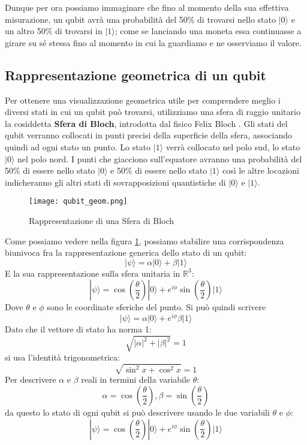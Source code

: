 Dunque per ora possiamo immaginare che fino al momento della sua effettiva misurazione, un qubit avrà una probabilità del 50\% di trovarsi nello stato \( | 0 \rangle \) e un altro 50\% di trovarsi in \( | 1 \rangle \); come se lanciando una moneta essa continuasse a girare su sé stessa fino al momento in cui la guardiamo e ne osserviamo il valore.

\subsection{Rappresentazione geometrica di un qubit}
Per ottenere una visualizzazione geometrica utile per comprendere meglio i diversi stati in cui un qubit può trovarsi, utilizziamo una sfera di raggio unitario la cosiddetta \textbf{Sfera di Bloch}, introdotta dal fisico Felix Bloch \cite{bloch_sphere}.
Gli stati del qubit verranno collocati in punti precisi della superficie della sfera, associando quindi ad ogni stato un punto. Lo stato \( | 1 \rangle \) verrà collocato nel polo sud, lo stato \( | 0 \rangle \) nel polo nord. I punti che giacciono sull'equatore avranno una probabilità del 50\% di essere nello stato \( | 0 \rangle \) e 50\% di essere nello stato \( | 1 \rangle \) così le altre locazioni indicheranno gli altri stati di sovrapposizioni quantistiche di \( | 0 \rangle \) e \( | 1 \rangle \).

\begin{figure}[h]
  \centering
  \texttt{[image: qubit\_geom.png]}
  \caption{Rappresentazione di una Sfera di Bloch}
  \label{fig:qubit_geom}
\end{figure}

Come possiamo vedere nella figura \ref{fig:qubit_geom}, possiamo stabilire una corrispondenza biunivoca fra la rappresentazione generica dello stato di un qubit:
\[
  | \psi \rangle
  = \alpha | 0 \rangle
  + \beta | 1 \rangle
\]
E la sua rappresentazione sulla sfera unitaria in \( \mathbb{R} ^3 \):
\[
  | \psi \rangle
  = \cos \left( \frac{\theta}{2} \right)
  | 0 \rangle
  + e^{i\phi}
  \sin \left( \frac{\theta}{2} \right)
  | 1 \rangle
\]
Dove \( \theta \) e \( \phi \) sono le coordinate sferiche del punto. Si può quindi scrivere
\[
  | \psi \rangle
  = \alpha | 0 \rangle
  + e^{i\phi} \beta | 1 \rangle
\]
Dato che il vettore di stato ha norma 1:
\[
  \sqrt{
    |\alpha|^2
    + |\beta|^2
  }
  = 1
\]
si usa l'identità trigonometrica:
\[
  \sqrt{
    \sin^2 x
    + \cos^2 x
  }
  = 1
\]
Per descrivere \( \alpha \) e \( \beta \) reali in termini della variabile \( \theta \):
\[
  \alpha = \cos \left( \frac{\theta}{2} \right), 
  \beta = \sin \left( \frac{\theta}{2} \right)
\]
da questo lo stato di ogni qubit si può descrivere usando le due variabili \(\theta\) e \(\phi\):
\[
  | \psi \rangle
  = \cos \left( \frac{\theta}{2} \right) | 0 \rangle
  + e^{i\phi} \sin \left( \frac{\theta}{2} \right) | 1 \rangle
\]

